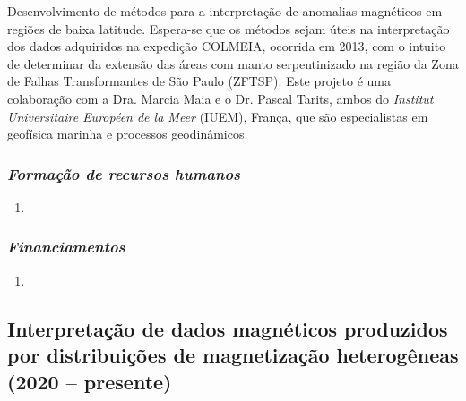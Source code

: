 Desenvolvimento de métodos para a interpretação de anomalias magnéticos em regiões de 
baixa latitude. Espera-se que os métodos sejam úteis na interpretação dos dados 
adquiridos na  expedição COLMEIA, ocorrida em 2013, com o intuito de determinar da extensão
das áreas com manto serpentinizado na região da Zona de Falhas Transformantes de São Paulo
(ZFTSP). Este projeto é uma colaboração com a Dra. Marcia Maia e o Dr. Pascal Tarits, ambos
do \textit{Institut Universitaire Européen de la Meer} (IUEM), França, que são 
especialistas em geofísica marinha e processos geodinâmicos.

\subsubsection{\emph{Formação de recursos humanos}}

\begin{enumerate}
	
	\item{}
	
\end{enumerate}

\subsubsection{\emph{Financiamentos}}

\begin{enumerate}
	
	\item{}
	
\end{enumerate}


\subsection{Interpretação de dados magnéticos produzidos por distribuições de magnetização heterogêneas (2020 -- presente)} \label{projeto-mag-heterogenea}


